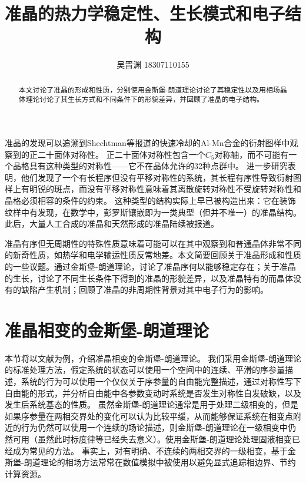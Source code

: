 \documentclass[hyperref, UTF8, a4paper]{ctexart}
\title{准晶的热力学稳定性、生长模式和电子结构}
\author{吴晋渊 18307110155}
\date{}
\begin{document}
\maketitle

\vspace{-3em}

\begin{abstract}
    本文讨论了准晶的形成和性质，分别使用金斯堡-朗道理论讨论了其稳定性以及用相场晶体理论讨论了其生长方式和不同条件下的形貌差异，并回顾了准晶的电子结构。
\end{abstract}

\vspace{3em}

准晶的发现可以追溯到Shechtman等报道的快速冷却的Al-Mn合金的衍射图样中观察到的正二十面体对称性\cite{PhysRevLett.53.1951}。
正二十面体对称性包含一个$C_5$对称轴，而不可能有一个晶格具有这种类型的对称性——它不在晶体允许的32种点群中\cite{Johnston_1960}。
进一步研究表明，他们发现了一个有长程序但没有平移对称性的系统，其长程有序性导致衍射图样上有明锐的斑点，而没有平移对称性意味着其离散旋转对称性不受旋转对称性和晶格必须相容的条件的约束。
这种类型的结构实际上早已被构造出来：它在装饰纹样中有发现\cite{science.1135491}，在数学中，彭罗斯镶嵌即为一类典型（但并不唯一）的准晶结构。
此后，大量人工合成的准晶\cite{PhysRevLett.55.511,PhysRevLett.59.1010}和天然形成的准晶陆续被报道\cite{science.1170827}。

准晶有序但无周期性的特殊性质意味着可能可以在其中观察到和普通晶体非常不同的新奇性质，如热学和电学输运性质反常地差\cite{Dolin_ek_2012}。本文简要回顾关于准晶形成和性质的一些议题。通过金斯堡-朗道理论，讨论了准晶序何以能够稳定存在；关于准晶的生长，讨论了不同生长条件下得到的准晶的形貌差异，以及准晶特有的而晶体没有的缺陷产生机制；回顾了准晶的非周期性背景对其中电子行为的影响。

\section{准晶相变的金斯堡-朗道理论}\label{sec:gl}

本节将以文献\cite{PhysRevB.32.5764}为例，介绍准晶相变的金斯堡-朗道理论。
我们采用金斯堡-朗道理论的标准处理方法，假定系统的状态可以使用一个空间中的连续、平滑的序参量描述，系统的行为可以使用一个仅仅关于序参量的自由能完整描述，通过对称性写下自由能的形式，并分析自由能中各参数变动时系统是否发生对称性自发破缺，以及发生后系统基态的性质。
虽然金斯堡-朗道理论通常是用于处理二级相变的，但是如果序参量在两相交界处的变化可以认为比较平缓，从而能够保证系统在相变点附近的行为仍然可以使用一个连续的场论描述，则金斯堡-朗道理论在一级相变中仍然可用（虽然此时标度律等已经失去意义）。使用金斯堡-朗道理论处理固液相变已经成为常见的方法\cite{fabrizio2008,PhysRevB.90.104101}。
事实上，对有明确、不连续的两相交界的一级相变，基于金斯堡-朗道理论的相场方法常常在数值模拟中被使用以避免显式追踪相边界、节约计算资源\cite{provatas2011phase,boettinger2002phase}。
\end{document}
